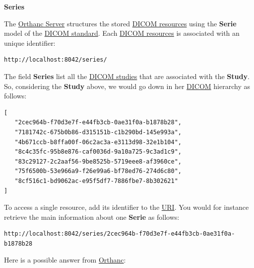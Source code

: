 \documentclass{tufte-book} %
\begin{document}

\clearpage


\textbf{Series}

\hfill

The \href{https://www.orthanc-server.com/}{Orthanc Server} structures the stored \href{http://book.orthanc-server.com/users/rest.html#sending-dicom-images}{DICOM resources} using the \textbf{Serie} model of the \href{https://www.dicomstandard.org/current/}{DICOM standard}. Each \href{http://book.orthanc-server.com/users/rest.html#sending-dicom-images}{DICOM resources} is associated with an unique identifier:

\begin{lstlisting}
http://localhost:8042/series/
\end{lstlisting}

\hfill

The field \textbf{Series} list all the \href{http://book.orthanc-server.com/users/rest.html#sending-dicom-images}{DICOM studies} that are associated with the \textbf{Study}. So, considering the \textbf{Study} above, we would go down in her \href{http://book.orthanc-server.com/users/rest.html#sending-dicom-images}{DICOM} hierarchy as follows:

\begin{lstlisting}
[
   "2cec964b-f70d3e7f-e44fb3cb-0ae31f0a-b1878b28",
   "7181742c-675b0b86-d315151b-c1b290bd-145e993a",
   "4b671ccb-b8ffa00f-06c2ac3a-e3113d98-32e1b104",
   "8c4c35fc-95b8e876-caf0036d-9a10a725-9c3ad1c9",
   "83c29127-2c2aaf56-9be8525b-5719eee8-af3960ce",
   "75f6500b-53e966a9-f26e99a6-bf78ed76-274d6c80",
   "8cf516c1-bd9062ac-e95f5df7-7886fbe7-8b302621"
]
\end{lstlisting}

\hfill

To access a single resource, add its identifier to the \href{https://en.wikipedia.org/wiki/Uniform_resource_identifier}{URI}. You would for instance retrieve the main information about one \textbf{Serie} as follows:

\begin{lstlisting}
http://localhost:8042/series/2cec964b-f70d3e7f-e44fb3cb-0ae31f0a-b1878b28
\end{lstlisting}

\hfill

Here is a possible answer from \href{https://www.orthanc-server.com/}{Orthanc}:
\end{document}
